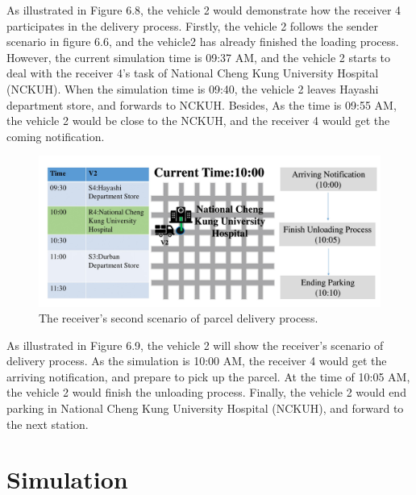 \documentclass[12pt]{ksthesis}
\begin{document}
\begin{thesis}
{As illustrated in Figure 6.8, the vehicle 2 would demonstrate how the receiver 4 participates in the delivery process. Firstly, the vehicle 2 follows the sender scenario in figure 6.6, and the vehicle2 has already finished the loading process.
However, the current simulation time is 09:37 AM, and the vehicle 2 starts to deal with the receiver 4’s task of National Cheng Kung University Hospital (NCKUH). When the simulation time is 09:40, the vehicle 2 leaves Hayashi department store, and forwards to NCKUH. Besides, As the time is 09:55 AM, the vehicle 2 would be close to the NCKUH, and the receiver 4 would get the coming notification.


\begin{figure}[H]
\centering
\includegraphics[width=1.14\textwidth]{./Thesis_figures/F6-9_receiverScenario2.PNG}
\caption{\large The receiver's second scenario of parcel delivery process.}
\vspace{0.5cm}
\label{Fig:Second_ReceiverScenario_DeliveryProcess}
\end{figure}

As illustrated in Figure 6.9, the vehicle 2 will show the receiver’s scenario of delivery process. As the simulation is 10:00 AM, the receiver 4 would get the arriving notification, and prepare to pick up the parcel. At the time of 10:05 AM, the vehicle 2 would finish the unloading process. Finally, the vehicle 2 would end parking in National Cheng Kung University Hospital (NCKUH), and forward to the next station.








\chapter{Simulation}\label{Chap:Simulation}

}
\end{thesis}
\end{document}
